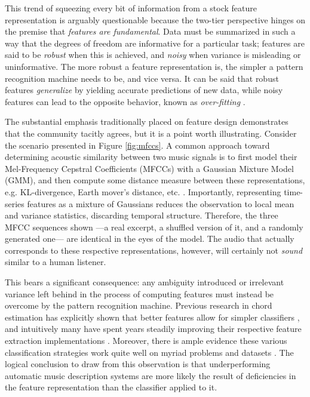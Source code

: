 This trend of squeezing every bit of information from a stock feature representation is arguably questionable because the two-tier perspective hinges on the premise that \emph{features are fundamental}.
Data must be summarized in such a way that the degrees of freedom are informative for a particular task; features are said to be \emph{robust} when this is achieved, and \emph{noisy} when variance is misleading or uninformative.
The more robust a feature representation is, the simpler a pattern recognition machine needs to be, and vice versa.
It can be said that robust features \emph{generalize} by yielding accurate predictions of new data, while noisy features can lead to the opposite behavior, known as \emph{over-fitting} \cite{Bishop2006}.

The substantial emphasis traditionally placed on feature design demonstrates that the community tacitly agrees, but it is a point worth illustrating.
Consider the scenario presented in Figure \ref{fig:mfccs}.
A common approach toward determining acoustic similarity between two music signals is to first model their Mel-Frequency Cepstral Coefficients (MFCCs) with a Gaussian Mixture Model (GMM), and then compute some distance measure between these representations, e.g. KL-divergence, Earth mover's distance, etc. \cite{Berenzweig2004}.
Importantly, representing time-series features as a mixture of Gaussians reduces the observation to local mean and variance statistics, discarding temporal structure.
Therefore, the three MFCC sequences shown ---a real excerpt, a shuffled version of it, and a randomly generated one--- are identical in the eyes of the model.
The audio that actually corresponds to these respective representations, however, will certainly not \emph{sound} similar to a human listener.

This bears a significant consequence: any ambiguity introduced or irrelevant variance left behind in the process of computing features must instead be overcome by the pattern recognition machine.
Previous research in chord estimation has explicitly shown that better features allow for simpler classifiers \cite{Cho2011}, and intuitively many have spent years steadily improving their respective feature extraction implementations \cite{Lyon2010,Mueller2011b}.
Moreover, there is ample evidence these various classification strategies work quite well on myriad problems and datasets \cite{Bishop2006}.
The logical conclusion to draw from this observation is that underperforming automatic music description systems are more likely the result of deficiencies in the feature representation than the classifier applied to it.

